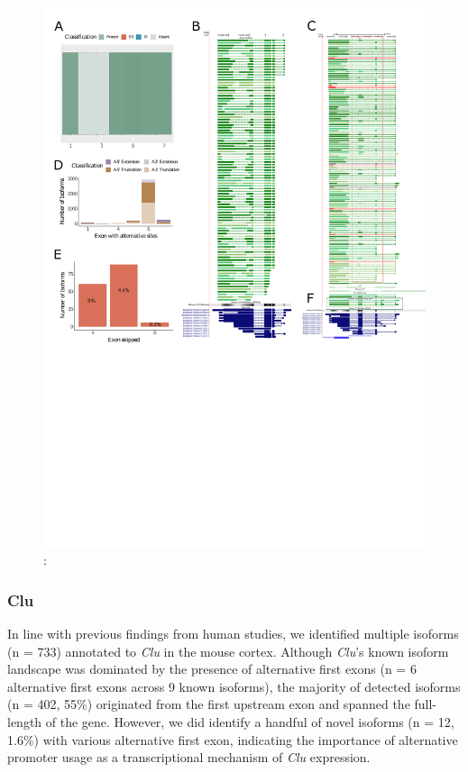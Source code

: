 \begin{figure}[htp]
	\begin{center}
		\includegraphics[page=7,trim={0 1cm 0 0},scale = 0.85]{Figures/TargetGenes_Annotation_Portrait.pdf}
	\end{center}
	\captionsetup{width=0.95\textwidth}
	\caption[RNA-Seq defined transcriptome]%
	{\textbf{}: }   
	\label{fig:snca}
\end{figure}

\subsubsection{Clu}
In line with previous findings from human studies, we identified multiple isoforms (n = 733) annotated to \textit{Clu} in the mouse cortex. Although \textit{Clu}'s known isoform landscape was dominated by the presence of alternative first exons (n = 6 alternative first exons across 9 known isoforms), the majority of detected isoforms (n = 402, 55\%) originated from the first upstream exon and spanned the full-length of the gene. However, we did identify a handful of novel isoforms (n = 12, 1.6\%) with various alternative first exon, indicating the importance of alternative promoter usage as a transcriptional mechanism of \textit{Clu} expression.


